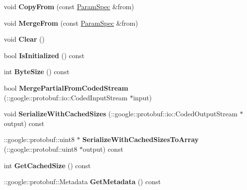 \begin{DoxyCompactItemize}
void {\bfseries Copy\+From} (const \mbox{\hyperlink{classcaffe_1_1_param_spec}{Param\+Spec}} \&from)
\item 
\mbox{\label{classcaffe_1_1_param_spec_ae84916032f90559ec4fa9bffad1be756}} 
void {\bfseries Merge\+From} (const \mbox{\hyperlink{classcaffe_1_1_param_spec}{Param\+Spec}} \&from)
\item 
\mbox{\label{classcaffe_1_1_param_spec_a4631ca26f5c870451131b80141ab98e4}} 
void {\bfseries Clear} ()
\item 
\mbox{\label{classcaffe_1_1_param_spec_a0f8c40f48806a954bcf380c797e02dc9}} 
bool {\bfseries Is\+Initialized} () const
\item 
\mbox{\label{classcaffe_1_1_param_spec_a0534277702bba1fd6c57d71858978b2e}} 
int {\bfseries Byte\+Size} () const
\item 
\mbox{\label{classcaffe_1_1_param_spec_acb2733af5d69c437a45577adfd64cad0}} 
bool {\bfseries Merge\+Partial\+From\+Coded\+Stream} (\+::google\+::protobuf\+::io\+::\+Coded\+Input\+Stream $\ast$input)
\item 
\mbox{\label{classcaffe_1_1_param_spec_af5e28a1112b6f3c35d85920f6ef3b2f4}} 
void {\bfseries Serialize\+With\+Cached\+Sizes} (\+::google\+::protobuf\+::io\+::\+Coded\+Output\+Stream $\ast$output) const
\item 
\mbox{\label{classcaffe_1_1_param_spec_a880213fe14bb64e5456167e939fdb4fb}} 
\+::google\+::protobuf\+::uint8 $\ast$ {\bfseries Serialize\+With\+Cached\+Sizes\+To\+Array} (\+::google\+::protobuf\+::uint8 $\ast$output) const
\item 
\mbox{\label{classcaffe_1_1_param_spec_a4de2ccc3181df794c67082ee074ac9d6}} 
int {\bfseries Get\+Cached\+Size} () const
\item 
\mbox{\label{classcaffe_1_1_param_spec_affbea32f8f8fd98c6f6c6d75fa05b23b}} 
\+::google\+::protobuf\+::\+Metadata {\bfseries Get\+Metadata} () const
\item 

\end{DoxyCompactItemize}
